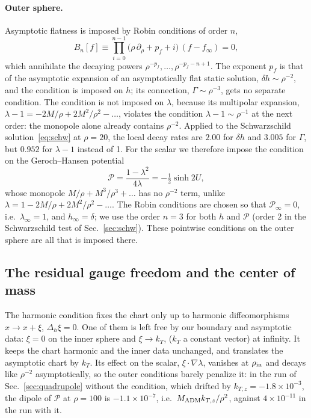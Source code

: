 \documentclass[aps,prd,twocolumn,superscriptaddress, nofootinbib,floatfix]{revtex4-2}
\begin{document}
\paragraph{Outer sphere.} Asymptotic flatness is imposed by Robin conditions of order $n$,
\begin{equation}
  B_n[f] \equiv \prod_{i=0}^{n-1}\bigl(\rho\,\partial_\rho + p_f + i\bigr)\,(f-f_\infty) = 0 ,
  \label{eq:robin}
\end{equation}
which annihilate the decaying powers $\rho^{-p_f},\dots,\rho^{-p_f-n+1}$.
The exponent $p_f$ is that of the asymptotic expansion of an asymptotically flat static solution, $\delta h\sim\rho^{-2}$, and the condition is imposed on $h$; its connection, $\Gamma\sim\rho^{-3}$, gets no separate condition.
The condition is not imposed on $\lambda$, because its multipolar expansion, $\lambda-1=-2M/\rho+2M^2/\rho^2-\dots$, violates the condition $\lambda-1\sim\rho^{-1}$ at the next order: the monopole alone already contains $\rho^{-2}$.
Applied to the Schwarzschild solution~\eqref{eq:schw} at $\rho=20$, the local decay rates are $2.00$ for $\delta h$ and $3.005$ for $\Gamma$, but $0.952$ for $\lambda-1$ instead of 1.
For the scalar we therefore impose the condition on the Geroch--Hansen potential~\cite{Geroch1970,Hansen1974}
\begin{equation}
  \mathcal P = \frac{1-\lambda^2}{4\lambda} = -\tfrac12\sinh 2U ,
  \label{eq:Ppot}
\end{equation}
whose monopole $M/\rho + M^3/\rho^3+\dots$ has no $\rho^{-2}$ term, unlike $\lambda = 1-2M/\rho+2M^2/\rho^2-\dots$.
The Robin conditions are chosen so that $\mathcal P_\infty=0$, i.e.\ $\lambda_\infty=1$, and $h_\infty=\delta$; we use the order $n=3$ for both $h$ and $\mathcal P$ (order 2 in the Schwarzschild test of Sec.~\ref{sec:schw}).
These pointwise conditions on the outer sphere are all that is imposed there.

\subsection{The residual gauge freedom and the center of mass}\label{sec:gaugefreedom}

The harmonic condition fixes the chart only up to harmonic diffeomorphisms $x \to x+\xi$, $\Delta_h\xi = 0$.
One of them is left free by our boundary and asymptotic  data: $\xi = 0$ on the inner sphere and $\xi\to k_T$, ($k_T$ a constant vector) at infinity.
It keeps the chart harmonic and the inner data unchanged, and translates the asymptotic chart by $k_T$.
Its effect on the scalar, $\xi\cdot\nabla\lambda$, vanishes at $\rho_{\rm in}$ and decays like $\rho^{-2}$ asymptotically, so the outer conditions barely penalize it: in the run of Sec.~\ref{sec:quadrupole} without the condition, which drifted by $k_{T,z}=-1.8\times10^{-3}$, the dipole of $\mathcal P$ at $\rho=100$ is $-1.1\times10^{-7}$, i.e.\ $M_{\rm ADM}k_{T,z}/\rho^2$, against $4\times10^{-11}$ in the run with it.
\end{document}
